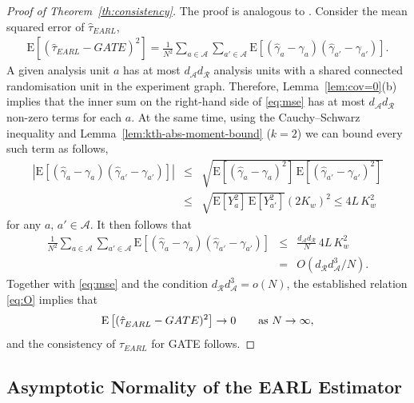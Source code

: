 \documentclass[sigconf]{acmart}
\newcommand{\E}{\mathrm E}
\begin{document}
\begin{proof}[Proof of Theorem~\ref{th:consistency}]
    The proof is analogous to \cite[Theorem~4.2]{harshaw2023erl}. Consider the mean squared error of $\hat\tau_{EARL}$,
    \begin{eqnarray}\label{eq:mse}
        \E\left[(\hat\tau^{\phantom{1}}_{EARL} - GATE)^2\right] = \frac 1 {N^2} \sum_{a\in\mathcal{A}}\sum_{a'\in\mathcal{A}}\E[(\hat\gamma_a-\gamma_a)(\hat\gamma_{a'}-\gamma_{a'})].
    \end{eqnarray}
    A given analysis unit $a$ has at most $d_{\mathcal A}d_{\mathcal R}$ analysis units with a shared connected randomisation unit in the experiment graph. Therefore, Lemma~\ref{lem:cov=0}(b) implies that the inner sum on the right-hand side of \eqref{eq:mse} has at most $d_{\mathcal A}d_{\mathcal R}$ non-zero terms for each $a$. At the same time, using the Cauchy--Schwarz inequality and Lemma~\ref{lem:kth-abs-moment-bound} ($k=2$) we can bound every such term as follows,
\begin{eqnarray*}
    \left|\E[(\hat\gamma_{a}-\gamma_{a})(\hat\gamma_{a'}-\gamma_{a'})]\right| &\le&
    \sqrt{\E[(\hat\gamma_{a}-\gamma_{a})^2]\,\E[(\hat\gamma_{a'}-\gamma_{a'})^2]} \nonumber\\
    &\le& \sqrt{\E[Y_a^2]\,\E[Y_{a'}^2]}\left(2K_w\right)^2
    \le 4L\,K_w^2
\end{eqnarray*}
for any $a,\,a'\in\mathcal{A}$.
It then follows that
\begin{eqnarray}\label{eq:O}
    \frac 1 {N^2} \sum_{a\in\mathcal{A}}\sum_{a'\in\mathcal{A}}\E[(\hat\gamma_a-\gamma_a)(\hat\gamma_{a'}-\gamma_{a'})] &\le& \frac{d_{\mathcal A}d_{\mathcal R}}{N}\, 4L\,K_w^2 \nonumber\\ &=& O(d_{\mathcal R}^{\phantom{1}}d_{\mathcal A}^3/N).
\end{eqnarray}
Together with \eqref{eq:mse} and the condition $d_{\mathcal R}^{\phantom{1}}d_{\mathcal A}^3=o(N)$, the established relation \eqref{eq:O} implies that
$$
\E\left[(\hat\tau^{\phantom{1}}_{EARL} - GATE)^2\right]\to 0\qquad \textup{as }N\to\infty,
$$
and the consistency of $\hat\tau^{\phantom{1}}_{EARL}$ for GATE follows.
\end{proof}

\subsection{Asymptotic Normality of the EARL Estimator}
\end{document}
